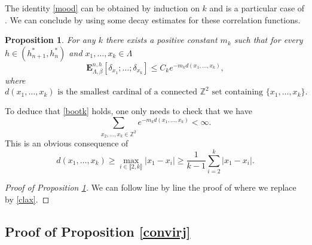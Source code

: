 \documentclass[JEP,XML,SOM,Unicode, NoFloatCountersInSection]{cedram}
\numberwithin{equation}{section}
\theoremstyle{plain}
\newtheorem{proposition}[theorem]{Proposition}
\theoremstyle{definition}
\newcommand{\lint}{\llbracket}
\newcommand{\rint}{\rrbracket}
\newcommand{\bE}{{\ensuremath{\mathbf E}} }
\newcommand{\bbZ}{{\ensuremath{\mathbb Z}} }
\newcommand{\gb}{\beta}
\newcommand{\gL}{\Lambda}
\begin{document}
The identity \eqref{mood} can be obtained by induction on $k$ and is a particular case of \cite[Eq.\,(1.9)]{cf:vDK}.
We can conclude by using some decay estimates for these correlation functions.

\begin{proposition}\label{mickey}
For any $k$ there exists a positive constant $m_k$ such that for every $h\in (h^*_{n+1},h^*_n)$ and $x_1,\dots,x_k\in \gL$
\begin{equation*}
\bE^{n,h}_{\gL,\gb}\left[ \delta_{x_1} ;\dots ;\delta_{x_k} \right]\le C_k e^{-m_k d(x_1,\dots,x_k)},
\end{equation*}
where
\[
d(x_1,\dots,x_k)\text{ is the smallest cardinal of a connected $\bbZ^2$ set containing $\{x_1,\dots,x_k\}$.}
\]
\end{proposition}
To deduce that \eqref{bootk} holds, one only needs to check that we have
\begin{equation*}
\sum_{x_2,\dots,x_k\in \bbZ^2} e^{-m_k d(x_1,\dots,x_k)}<\infty.
\end{equation*}
This is an obvious consequence of
\begin{equation*}
d(x_1,\dots,x_k)\ge \max_{i\in \lint 2,k\rint} |x_1-x_i|\ge \frac{1}{k-1} \sum_{i=2}^k |x_1-x_i|.
\end{equation*}
\begin{proof}[Proof of Proposition \ref{mickey}]
We can follow line by line the proof of \cite[Lem.\,3.1]{cf:vDK} where we replace \cite[Ass.\,(3.2)]{cf:vDK} by \eqref{clax}.
\end{proof}

\subsection{Proof of Proposition \ref{convirj}}\label{lapriv}
\end{document}
